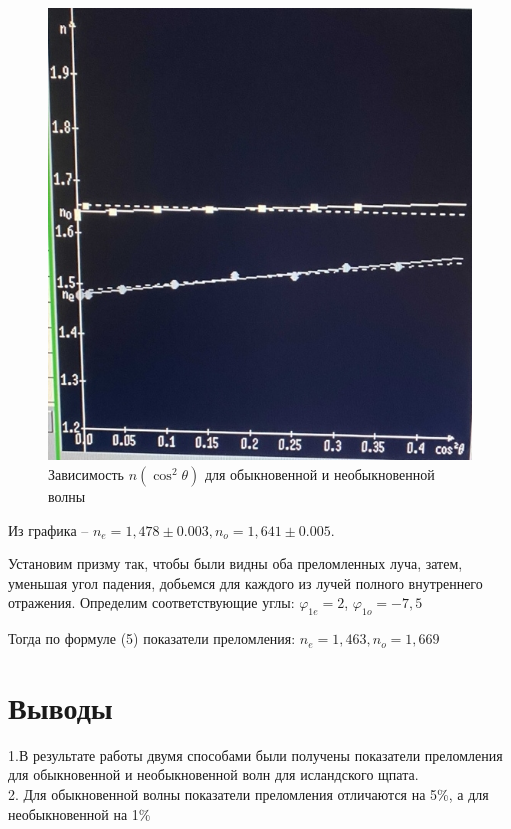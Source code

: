 \documentclass[a4paper,12pt]{article}
\begin{document}
\begin{figure}[h]
	\begin{center}
	\includegraphics[scale=0.6]{graph1}
	\caption{Зависимость $n(\cos^2 \theta)$ для обыкновенной и необыкновенной волны}
	\end{center}
\end{figure}

Из графика -- $n_e = 1,478 \pm 0.003, n_o = 1,641 \pm 0.005$.

Установим призму так, чтобы были видны оба преломленных луча, затем, уменьшая угол падения, добьемся для каждого из лучей полного внутреннего отражения. Определим соответствующие углы: $\varphi_{1e} = 2$\textdegree, $\varphi_{1o} = -7,5$\textdegree

Тогда по формуле (5) показатели преломления: $n_e = 1,463, n_o = 1,669$

\newpage

\section*{Выводы}

1.В результате работы двумя способами были получены показатели преломления для обыкновенной и необыкновенной волн для исландского щпата.\\
2. Для обыкновенной волны показатели преломления отличаются на 5\%, а для необыкновенной на 1\%
\end{document}

